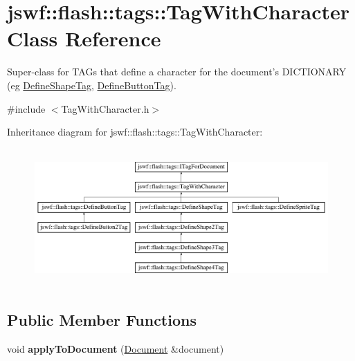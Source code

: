 \hypertarget{classjswf_1_1flash_1_1tags_1_1_tag_with_character}{\section{jswf\+:\+:flash\+:\+:tags\+:\+:Tag\+With\+Character Class Reference}
\label{classjswf_1_1flash_1_1tags_1_1_tag_with_character}
}


Super-\/class for {\ttfamily T\+A\+G}s that define a character for the document's {\ttfamily D\+I\+C\+T\+I\+O\+N\+A\+R\+Y} (eg \hyperlink{classjswf_1_1flash_1_1tags_1_1_define_shape_tag}{Define\+Shape\+Tag}, \hyperlink{classjswf_1_1flash_1_1tags_1_1_define_button_tag}{Define\+Button\+Tag}).  




{\ttfamily \#include $<$Tag\+With\+Character.\+h$>$}

Inheritance diagram for jswf\+:\+:flash\+:\+:tags\+:\+:Tag\+With\+Character\+:\begin{figure}[H]
\begin{center}
\leavevmode
\includegraphics[height=5.283019cm]{classjswf_1_1flash_1_1tags_1_1_tag_with_character}
\end{center}
\end{figure}
\subsection*{Public Member Functions}
\begin{DoxyCompactItemize}
\item 
\hypertarget{classjswf_1_1flash_1_1tags_1_1_tag_with_character_ae3feba0ed681ebcc7c980f93390de8f2}{void {\bfseries apply\+To\+Document} (\hyperlink{classjswf_1_1flash_1_1_document}{Document} \&document)}\label{classjswf_1_1flash_1_1tags_1_1_tag_with_character_ae3feba0ed681ebcc7c980f93390de8f2}

\end{DoxyCompactItemize}
